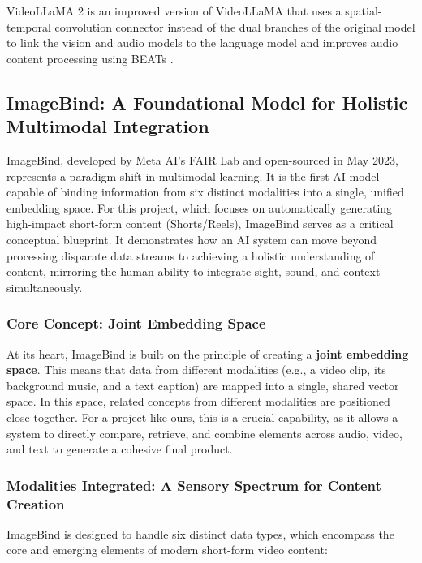 \documentclass[12pt,a4paper,oneside,english]{book}
\begin{document}
VideoLLaMA 2 \citep{cheng2024videollama2} is an improved version of VideoLLaMA that uses a spatial-temporal convolution connector instead of the dual branches of the original model to link the vision and audio models to the language model and improves audio content processing using BEATs \citep{chen2022beatsaudiopretrainingacoustic}.
\subsection{ImageBind: A Foundational Model for Holistic Multimodal Integration}

ImageBind, developed by Meta AI's FAIR Lab and open-sourced in May 2023, represents a paradigm shift in multimodal learning. It is the first AI model capable of binding information from six distinct modalities into a single, unified embedding space. For this project, which focuses on automatically generating high-impact short-form content (Shorts/Reels), ImageBind serves as a critical conceptual blueprint. It demonstrates how an AI system can move beyond processing disparate data streams to achieving a holistic understanding of content, mirroring the human ability to integrate sight, sound, and context simultaneously.

\subsubsection{Core Concept: Joint Embedding Space}
\label{subsubsec:joint_embedding_space}

At its heart, ImageBind is built on the principle of creating a \textbf{joint embedding space}. This means that data from different modalities (e.g., a video clip, its background music, and a text caption) are mapped into a single, shared vector space. In this space, related concepts from different modalities are positioned close together. For a project like ours, this is a crucial capability, as it allows a system to directly compare, retrieve, and combine elements across audio, video, and text to generate a cohesive final product.
\subsubsection{Modalities Integrated: A Sensory Spectrum for Content Creation}

ImageBind is designed to handle six distinct data types, which encompass the core and emerging elements of modern short-form video content:
\end{document}

